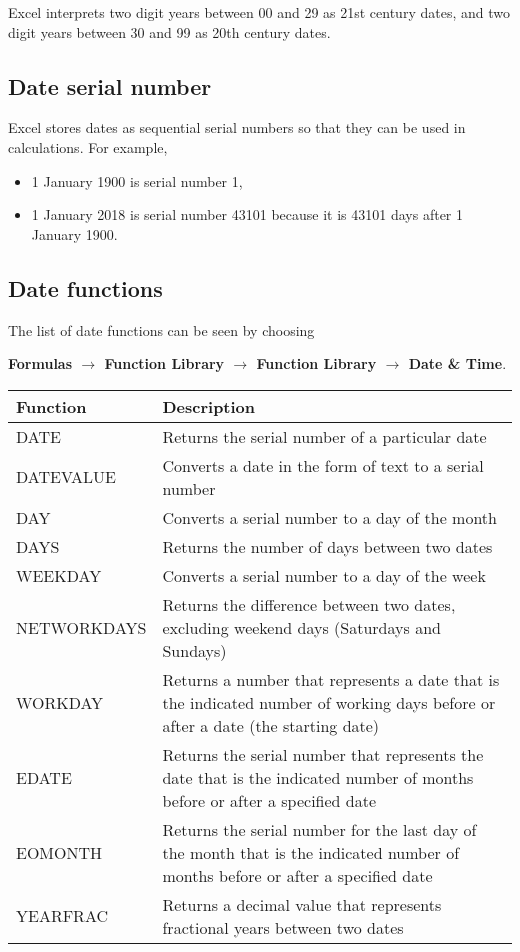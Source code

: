 \documentclass[
]{article}
\theoremstyle{definition}
\theoremstyle{definition}
\theoremstyle{definition}
\theoremstyle{definition}
\theoremstyle{remark}
\begin{document}
Excel interprets two digit years between 00 and 29 as 21st century
dates, and two digit years between 30 and 99 as 20th century dates.

\hypertarget{date-serial-number}{%
\subsection{Date serial number}\label{date-serial-number}}

Excel stores dates as sequential serial numbers so that they can be used
in calculations. For example,

\begin{itemize}
\item
  1 January 1900 is serial number 1,
\item
  1 January 2018 is serial number 43101 because it is 43101 days after
  1 January 1900.
\end{itemize}

\hypertarget{date-functions}{%
\subsection{Date functions}\label{date-functions}}

The list of date functions can be seen by choosing

\textbf{Formulas \(\rightarrow\) Function Library \(\rightarrow\) Function Library \(\rightarrow\) Date \& Time}.

\begin{longtable}[]{@{}ll@{}}
\toprule
\textbf{Function} & \textbf{Description} \\
\midrule
\endhead
DATE & Returns the serial number of a particular date \\
DATEVALUE & Converts a date in the form of text to a serial number \\
DAY & Converts a serial number to a day of the month \\
DAYS & Returns the number of days between two dates \\
WEEKDAY & Converts a serial number to a day of the week \\
NETWORKDAYS & Returns the difference between two dates, excluding weekend days (Saturdays and Sundays) \\
WORKDAY & Returns a number that represents a date that is the indicated number of working days before or after a date (the starting date) \\
EDATE & Returns the serial number that represents the date that is the indicated number of months before or after a specified date \\
EOMONTH & Returns the serial number for the last day of the month that is the indicated number of months before or after a specified date \\
YEARFRAC & Returns a decimal value that represents fractional years between two dates \\
\bottomrule
\end{longtable}
\end{document}
